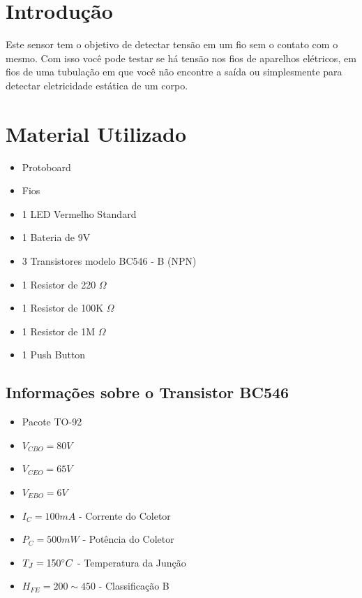 \section{Introdução}\label{introduuxe7uxe3o}

Este sensor tem o objetivo de detectar tensão em um fio sem o contato
com o mesmo. Com isso você pode testar se há tensão nos fios de
aparelhos elétricos, em fios de uma tubulação em que você não encontre a
saída ou simplesmente para detectar eletricidade estática de um corpo.

\section{Material Utilizado}\label{material-utilizado}

\begin{itemize}
\itemsep1pt\parskip0pt
\item
  Protoboard
\item
  Fios
\item
  1 LED Vermelho Standard
\item
  1 Bateria de 9V
\item
  3 Transistores modelo BC546 - B (NPN)
\item
  1 Resistor de 220 $\Omega$
\item
  1 Resistor de 100K $\Omega$
\item
  1 Resistor de 1M $\Omega$
\item
  1 Push Button
\end{itemize}

\subsection{Informações sobre o Transistor
BC546}\label{informauxe7uxf5es-sobre-o-transistor-bc546}

\begin{itemize}
\itemsep1pt\parskip0pt
\item
  Pacote TO-92
\item
  $V_{CBO} = 80V$
\item
  $V_{CEO} = 65V$
\item
  $V_{EBO} = 6V$
\item
  $I_C = 100mA$ - Corrente do Coletor
\item
  $P_C = 500mW$ - Potência do Coletor
\item
  $T_J = 150 \degree C$ - Temperatura da Junção
\item
  $H_{FE} = 200 \sim 450$ - Classificação B
\end{itemize}

